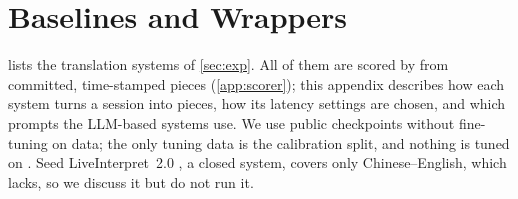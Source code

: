\section{Baselines and Wrappers}\label{app:baselines}

 lists the translation systems of \cref{sec:exp}. All of them are scored by \scorer from committed, time-stamped pieces (\cref{app:scorer}); this appendix describes how each system turns a session into pieces, how its latency settings are chosen, and which prompts the LLM-based systems use. We use public checkpoints without fine-tuning on \task data; the only tuning data is the \syn calibration split, and nothing is tuned on \taxi. Seed LiveInterpret~2.0 \citep{cheng2025seed}, a closed system, covers only Chinese--English, which \bench lacks, so we discuss it but do not run it.



